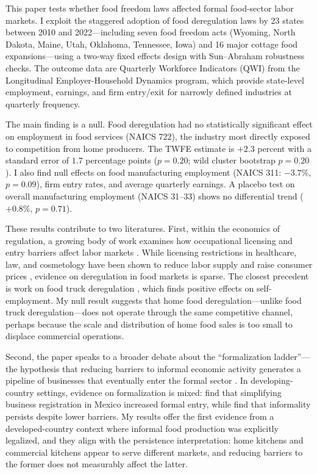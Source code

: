 \documentclass[12pt]{article}
\begin{document}
This paper tests whether food freedom laws affected formal food-sector labor markets. I exploit the staggered adoption of food deregulation laws by 23 states between 2010 and 2022---including seven food freedom acts (Wyoming, North Dakota, Maine, Utah, Oklahoma, Tennessee, Iowa) and 16 major cottage food expansions---using a two-way fixed effects design with Sun--Abraham \citep{sun2021estimating} robustness checks. The outcome data are Quarterly Workforce Indicators (QWI) from the Longitudinal Employer-Household Dynamics program, which provide state-level employment, earnings, and firm entry/exit for narrowly defined industries at quarterly frequency.

The main finding is a null. Food deregulation had no statistically significant effect on employment in food services (NAICS 722), the industry most directly exposed to competition from home producers. The TWFE estimate is $+2.3$ percent with a standard error of $1.7$ percentage points ($p = 0.20$; wild cluster bootstrap $p = 0.20$). I also find null effects on food manufacturing employment (NAICS 311: $-3.7\%$, $p = 0.09$), firm entry rates, and average quarterly earnings. A placebo test on overall manufacturing employment (NAICS 31--33) shows no differential trend ($+0.8\%$, $p = 0.71$).

These results contribute to two literatures. First, within the economics of regulation, a growing body of work examines how occupational licensing and entry barriers affect labor markets \citep{kleiner2006licensing, kleiner2013analyzing}. While licensing restrictions in healthcare, law, and cosmetology have been shown to reduce labor supply and raise consumer prices \citep{law2006effects, thornton2010licensing}, evidence on deregulation in food markets is sparse. The closest precedent is work on food truck deregulation \citep{shoag2019removing}, which finds positive effects on self-employment. My null result suggests that home food deregulation---unlike food truck deregulation---does not operate through the same competitive channel, perhaps because the scale and distribution of home food sales is too small to displace commercial operations.

Second, the paper speaks to a broader debate about the ``formalization ladder''---the hypothesis that reducing barriers to informal economic activity generates a pipeline of businesses that eventually enter the formal sector \citep{demelash2014, bruhn2011, djankov2002regulation}. In developing-country settings, evidence on formalization is mixed: \citet{bruhn2011} find that simplifying business registration in Mexico increased formal entry, while \citet{demelash2014} find that informality persists despite lower barriers. My results offer the first evidence from a developed-country context where informal food production was explicitly legalized, and they align with the persistence interpretation: home kitchens and commercial kitchens appear to serve different markets, and reducing barriers to the former does not measurably affect the latter.
\end{document}
